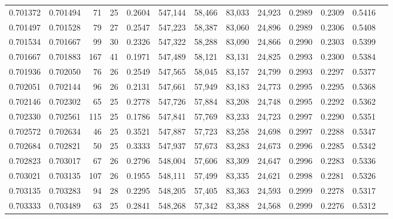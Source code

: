 \begin{tabular}{rrrrrrrrrrrrr}
0.701372 & 0.701494 &     71 &    25 &                                     0.2604 & 547,144 &  58,466 &  83,033 &  24,923 & 0.2989 & 0.2309 & 0.5416 \\
0.701497 & 0.701528 &     79 &    27 &                                     0.2547 & 547,223 &  58,387 &  83,060 &  24,896 & 0.2989 & 0.2306 & 0.5408 \\
0.701534 & 0.701667 &     99 &    30 &                                     0.2326 & 547,322 &  58,288 &  83,090 &  24,866 & 0.2990 & 0.2303 & 0.5399 \\
0.701667 & 0.701883 &    167 &    41 &                                     0.1971 & 547,489 &  58,121 &  83,131 &  24,825 & 0.2993 & 0.2300 & 0.5384 \\
0.701936 & 0.702050 &     76 &    26 &                                     0.2549 & 547,565 &  58,045 &  83,157 &  24,799 & 0.2993 & 0.2297 & 0.5377 \\
0.702051 & 0.702144 &     96 &    26 &                                     0.2131 & 547,661 &  57,949 &  83,183 &  24,773 & 0.2995 & 0.2295 & 0.5368 \\
0.702146 & 0.702302 &     65 &    25 &                                     0.2778 & 547,726 &  57,884 &  83,208 &  24,748 & 0.2995 & 0.2292 & 0.5362 \\
0.702330 & 0.702561 &    115 &    25 &                                     0.1786 & 547,841 &  57,769 &  83,233 &  24,723 & 0.2997 & 0.2290 & 0.5351 \\
0.702572 & 0.702634 &     46 &    25 &                                     0.3521 & 547,887 &  57,723 &  83,258 &  24,698 & 0.2997 & 0.2288 & 0.5347 \\
0.702684 & 0.702821 &     50 &    25 &                                     0.3333 & 547,937 &  57,673 &  83,283 &  24,673 & 0.2996 & 0.2285 & 0.5342 \\
0.702823 & 0.703017 &     67 &    26 &                                     0.2796 & 548,004 &  57,606 &  83,309 &  24,647 & 0.2996 & 0.2283 & 0.5336 \\
0.703021 & 0.703135 &    107 &    26 &                                     0.1955 & 548,111 &  57,499 &  83,335 &  24,621 & 0.2998 & 0.2281 & 0.5326 \\
0.703135 & 0.703283 &     94 &    28 &                                     0.2295 & 548,205 &  57,405 &  83,363 &  24,593 & 0.2999 & 0.2278 & 0.5317 \\
0.703333 & 0.703489 &     63 &    25 &                                     0.2841 & 548,268 &  57,342 &  83,388 &  24,568 & 0.2999 & 0.2276 & 0.5312 \\

\end{tabular}
